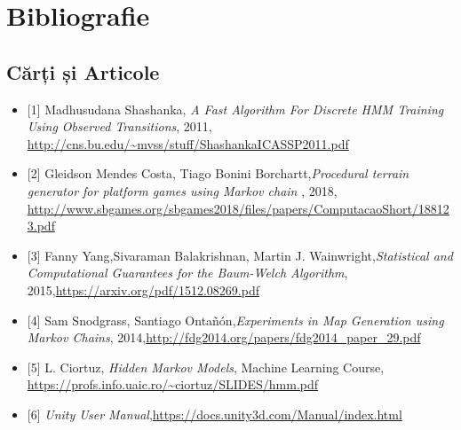 \chapter*{Bibliografie} 
\section{Cărți și Articole}
\begin{itemize}
    \item{[1] Madhusudana Shashanka, \textit{A Fast Algorithm For Discrete HMM Training Using Observed Transitions}, 2011, \newline \url{http://cns.bu.edu/~mvss/stuff/ShashankaICASSP2011.pdf}}
    \item{[2] Gleidson Mendes Costa, Tiago Bonini Borchartt,\newline \textit{Procedural terrain generator for platform games using Markov chain
}, 2018,  \url{http://www.sbgames.org/sbgames2018/files/papers/ComputacaoShort/188123.pdf}}
	\item{[3] Fanny Yang,Sivaraman Balakrishnan, Martin J. Wainwright,\newline \textit{Statistical and Computational Guarantees for the
Baum-Welch Algorithm}, 2015,\newline \url{https://arxiv.org/pdf/1512.08269.pdf}}
	\item{[4] Sam Snodgrass, Santiago Ontañón,\newline \textit{Experiments in Map Generation using Markov Chains}, 2014,\newline \url{http://fdg2014.org/papers/fdg2014_paper_29.pdf}}
	\item {[5] L. Ciortuz, \textit{Hidden Markov Models}, Machine Learning Course, \newline \url{https://profs.info.uaic.ro/~ciortuz/SLIDES/hmm.pdf}}
	\item{[6] \textit{Unity User Manual},\newline \url{https://docs.unity3d.com/Manual/index.html}}
\end{itemize}

\pagebreak

